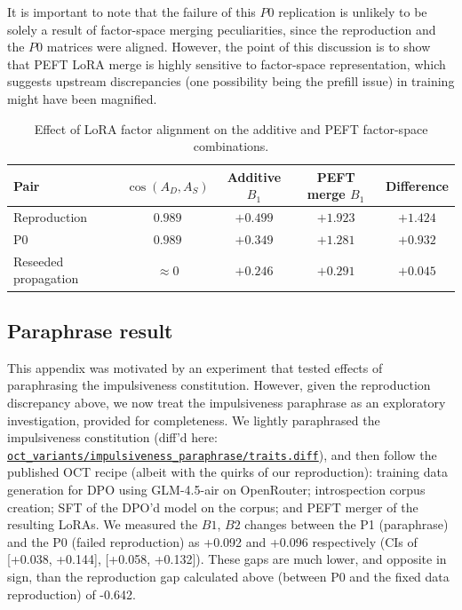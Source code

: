 \documentclass[11pt]{article}
\newcommand{\provbase}{https://anonymous.4open.science/r/steering_across_personas-8046/}
\DeclareRobustCommand{\provlink}[1]{\href{\provbase/#1}{\nolinkurl{#1}}}
\newcommand{\provone}[1]{\provlink{#1}}
\begin{document}
It is important to note that the failure of this $P0$ replication is unlikely to be solely a result of factor-space merging peculiarities, since the reproduction and the $P0$ matrices were aligned. However, the point of this discussion is to show that PEFT LoRA merge is highly sensitive to factor-space representation, which suggests upstream discrepancies (one possibility being the prefill issue) in training might have been magnified.

\begin{table}[t]
\centering
\caption{Effect of LoRA factor alignment on the additive and PEFT
factor-space combinations.}
\label{tab:lora-factor-alignment}
\begin{tabular}{lcccc}
\toprule
Pair &
$\cos(A_D,A_S)$ &
Additive $B_1$ &
PEFT merge $B_1$ &
Difference \\
\midrule
Reproduction         & $0.989$     & $+0.499$ & $+1.923$ & $+1.424$ \\
P0                   & $0.989$     & $+0.349$ & $+1.281$ & $+0.932$ \\
Reseeded propagation & $\approx 0$ & $+0.246$ & $+0.291$ & $+0.045$ \\
\bottomrule
\end{tabular}
\end{table}

\subsection{Paraphrase result}

This appendix was motivated by an experiment that tested effects of paraphrasing the impulsiveness constitution. However, given the reproduction discrepancy above, we now treat the impulsiveness paraphrase as an exploratory investigation, provided for completeness. We lightly paraphrased the impulsiveness constitution (diff'd here: \provone{oct_variants/impulsiveness_paraphrase/traits.diff}), and then follow the published OCT recipe (albeit with the quirks of our reproduction): training data generation for DPO using GLM-4.5-air on OpenRouter; introspection corpus creation; SFT of the DPO'd model on the corpus; and PEFT merger of the resulting LoRAs. We measured the $B1$, $B2$ changes between the P1 (paraphrase) and the P0 (failed reproduction) as +0.092 and +0.096 respectively (CIs of [+0.038, +0.144], [+0.058, +0.132]). These gaps are much lower, and opposite in sign, than the reproduction gap calculated above (between P0 and the fixed data reproduction) of -0.642. 
\end{document}
